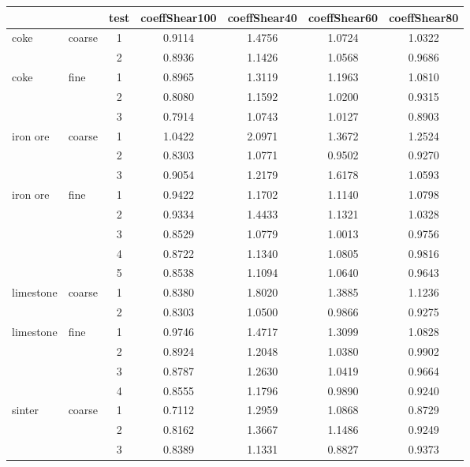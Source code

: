 \begin{table}%
\centering
\begin{tabular}{ll|ccccc}
\hline
          &       & test  & coeffShear100 & coeffShear40 & coeffShear60 & coeffShear80 \\
\hline          
    coke  & coarse & 1     & 0.9114 & 1.4756 & 1.0724 & 1.0322 \\
          &       & 2     & 0.8936 & 1.1426 & 1.0568 & 0.9686 \\
\hline     
    coke  & fine  & 1     & 0.8965 & 1.3119 & 1.1963 & 1.0810 \\
          &       & 2     & 0.8080 & 1.1592 & 1.0200 & 0.9315 \\
          &       & 3     & 0.7914 & 1.0743 & 1.0127 & 0.8903 \\
\hline 
    iron ore & coarse & 1     & 1.0422 & 2.0971 & 1.3672 & 1.2524 \\
          &       & 2     & 0.8303 & 1.0771 & 0.9502 & 0.9270 \\
          &       & 3     & 0.9054 & 1.2179 & 1.6178 & 1.0593 \\
\hline 
    iron ore & fine  & 1     & 0.9422 & 1.1702 & 1.1140 & 1.0798 \\
          &       & 2     & 0.9334 & 1.4433 & 1.1321 & 1.0328 \\
          &       & 3     & 0.8529 & 1.0779 & 1.0013 & 0.9756 \\
          &       & 4     & 0.8722 & 1.1340 & 1.0805 & 0.9816 \\
          &       & 5     & 0.8538 & 1.1094 & 1.0640 & 0.9643 \\
\hline 
    limestone & coarse & 1     & 0.8380 & 1.8020 & 1.3885 & 1.1236 \\
          &       & 2     & 0.8303 & 1.0500 & 0.9866 & 0.9275 \\
\hline 
    limestone & fine  & 1     & 0.9746 & 1.4717 & 1.3099 & 1.0828 \\
          &       & 2     & 0.8924 & 1.2048 & 1.0380 & 0.9902 \\
          &       & 3     & 0.8787 & 1.2630 & 1.0419 & 0.9664 \\
          &       & 4     & 0.8555 & 1.1796 & 0.9890 & 0.9240 \\
\hline 
    sinter & coarse & 1     & 0.7112 & 1.2959 & 1.0868 & 0.8729 \\
          &       & 2     & 0.8162 & 1.3667 & 1.1486 & 0.9249 \\
          &       & 3     & 0.8389 & 1.1331 & 0.8827 & 0.9373 \\

\end{tabular}
\end{table}
